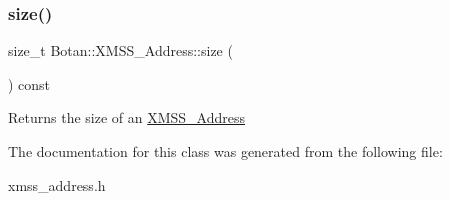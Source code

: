 \subsubsection{\texorpdfstring{size()}{size()}}
{\footnotesize\ttfamily size\+\_\+t Botan\+::\+X\+M\+S\+S\+\_\+\+Address\+::size (\begin{DoxyParamCaption}{ }\end{DoxyParamCaption}) const\hspace{0.3cm}{\ttfamily [inline]}}

\begin{DoxyReturn}{Returns}
the size of an \hyperlink{class_botan_1_1_x_m_s_s___address}{X\+M\+S\+S\+\_\+\+Address} 
\end{DoxyReturn}


The documentation for this class was generated from the following file\+:\begin{DoxyCompactItemize}
\item 
xmss\+\_\+address.\+h\end{DoxyCompactItemize}
